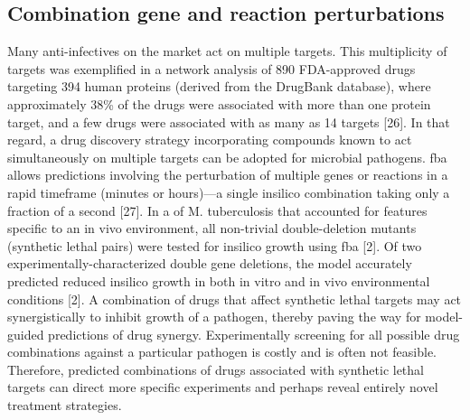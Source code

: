 \subsection{Combination gene and reaction perturbations}
Many anti-infectives on the market act on multiple targets. 
This multiplicity of targets was exemplified in a network 
analysis of 890 FDA-approved drugs targeting 394 human 
proteins (derived from the DrugBank database), where 
approximately 38\% of the drugs were associated with more 
than one protein target, and a few drugs were associated 
with as many as 14 targets [26]. In that regard, a drug 
discovery strategy incorporating compounds known to act 
simultaneously on multiple targets can be adopted for 
microbial pathogens. \gls{fba} allows predictions involving 
the perturbation of multiple genes or reactions in a rapid 
timeframe (minutes or hours)—a single \gls{insilico} combination 
taking only a fraction of a second [27]. In a  
of M. tuberculosis that accounted for features specific to 
an in vivo environment, all non-trivial double-deletion 
mutants (synthetic lethal pairs) were tested for \gls{insilico} 
growth using \gls{fba} [2]. Of two experimentally-characterized 
double gene deletions, the model accurately predicted reduced 
\gls{insilico} growth in both in vitro and in vivo environmental 
conditions [2]. A combination of drugs that affect synthetic 
lethal targets may act synergistically to inhibit growth of 
a pathogen, thereby paving the way for model-guided predictions 
of drug synergy. Experimentally screening for all possible 
drug combinations against a particular pathogen is costly 
and is often not feasible. Therefore, predicted combinations 
of drugs associated with synthetic lethal targets can direct 
more specific experiments and perhaps reveal entirely novel 
treatment strategies.

